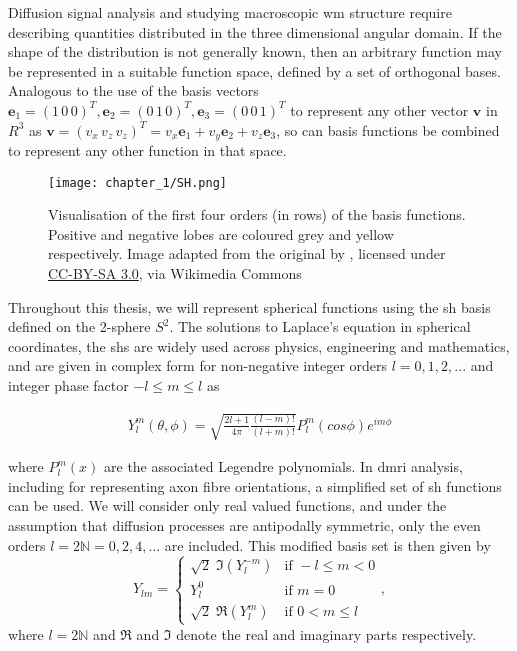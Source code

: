 Diffusion signal analysis and studying macroscopic \gls{wm} structure require describing quantities distributed in the three dimensional angular domain.
If the shape of the distribution is not generally known, then an arbitrary function may be represented in a suitable function space, defined by a set of orthogonal bases.
Analogous to the use of the basis vectors $\mathbf{e}_1=(1\,0\,0)^T, \mathbf{e}_2=(0\,1\,0)^T, \mathbf{e}_3=(0\,0\,1)^T$ to represent any other vector
$\mathbf{v}$ in $R^3$ as $\mathbf{v} =  (v_x\,v_z\,v_z)^T = v_x\mathbf{e}_1 + v_y\mathbf{e}_2 + v_z\mathbf{e}_3$,
so can basis functions be combined to represent any other function in that space.

\begin{SCfigure}
  \texttt{[image: chapter\_1/SH.png]}
  \caption[Spherical harmonic basis functions]{Visualisation of the first four orders (in rows) of the  basis functions. Positive and negative lobes are coloured grey and yellow respectively. Image adapted from the original by \citeauthor{Inigo.quilez2014}, licensed under \href{https://creativecommons.org/licenses/by-sa/3.0}{CC-BY-SA 3.0}, via Wikimedia Commons}
  \label{fig:sh}
\end{SCfigure}

Throughout this thesis, we will represent spherical functions using the \gls{sh} basis defined on the 2-sphere $S^2$.
The solutions to Laplace's equation in spherical coordinates, the \glspl{sh} are widely used across physics, engineering and mathematics, and are given in complex form for non-negative integer orders $l = 0, 1, 2,...$ and integer phase factor $-l \leqslant m \leqslant l$ as

\begin{align}
  Y_l^m(\theta,\phi) = \sqrt{ \frac{2l+1}{4\pi} \frac{(l-m)!}{(l+m)!} } P_l^m(cos\phi)e^{im\phi}
\end{align}

where $P_l^m(x)$ are the associated Legendre polynomials.
In \gls{dmri} analysis, including for representing axon fibre orientations, a simplified set of \gls{sh} functions can be used.
We will consider only real valued functions, and under the assumption that diffusion processes are antipodally symmetric, only the even orders $l = 2 \mathbb{N} = 0,2,4,...$ are included\autocite{Descoteaux2006}.
This modified basis set is then given by
\begin{equation}
  Y_{lm} = \begin{cases}
              \sqrt{2} \; \Im (Y_l^{-m}) & \text{if } -l \leq m < 0 \\
              Y_l^0                      & \text{if } m=0 \\
              \sqrt{2} \; \Re (Y_l^m)    & \text{if } 0 < m \leq l
           \end{cases}, \label{eq:sh}
\end{equation}
where $l = 2\mathbb{N}$ and $\Re$ and $\Im$ denote the real and imaginary parts respectively.

